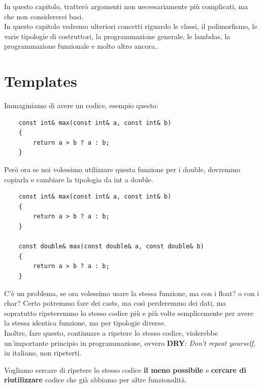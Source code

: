 \textsf{\small In questo capitolo, tratterò argomenti non necessariamente più complicati, ma che non considererei basi. } \\

\textsf{\small In questo capitolo vedremo ulteriori concetti riguardo le classi, il polimorfismo, le varie tipologie di costruttori, la programmazione generale, le lambdas, la programmazione funzionale e molto altro ancora..} \break



\newpage

\section{Templates}

\textsf{\small Immaginiamo di avere un codice, esempio questo:} \\

\begin{lstlisting}
	const int& max(const int& a, const int& b)
	{
		return a > b ? a : b;
	}
\end{lstlisting}

\textsf{\small Però ora se noi volessimo utilizzare questa funzione per i double, dovremmo copiarla e cambiare la tipologia da int a double.} \\

\begin{lstlisting}
	const int& max(const int& a, const int& b)
	{
		return a > b ? a : b;
	}

	const double& max(const double& a, const double& b)
	{
		return a > b ? a : b;
	}
\end{lstlisting}

\textsf{\small C'è un problema, se ora volessimo usare la stessa funzione, ma con i float? o con i char? Certo potremmo fare dei casts, ma così perderemmo dei dati, ma sopratutto ripeteremmo lo stesso codice più e più volte semplicemente per avere la stessa identica funzione, ma per tipologie diverse.} \\

\textsf{\small Inoltre, fare questo, continuare a ripetere lo stesso codice, violerebbe un'importante principio in programmazione, ovvero \textbf{DRY}: \emph{Don't repeat yourself}, in italiano, non ripeterti.} \break 

\textsf{\small Vogliamo cercare di ripetere lo stesso codice \textbf{il meno possibile} e \textbf{cercare di riutilizzare} codice che già abbiamo per altre funzionalità.} \\

